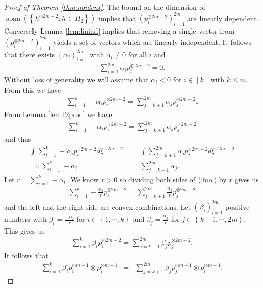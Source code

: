 \documentclass{article} %
\def\span{\operatorname{span}}
\theoremstyle{definition}
\begin{document}
\begin{proof}[Proof of Theorem \ref{thm:noident}]
The bound on the dimension of $\span\left( \left\{ h^{\otimes 2m-2}: h \in H_2 \right\} \right)$ implies that $\left( p_i^{\otimes 2m-2} \right)_{i=1}^{2m}$ are linearly dependent. Conversely Lemma \ref{lem:linind} implies that removing a single vector from $\left( p_i^{\otimes 2m-2} \right)_{i=1}^{2m}$ yields a set of vectors which are linearly independent. It follows that there exists $\left( \alpha_i \right)_{i=1}^{2m}$ with $\alpha_i \neq 0$ for all $i$ and
\begin{eqnarray*}
	\sum_{i=1}^{2m}\alpha_i p_i^{\otimes 2m-2} = 0.
\end{eqnarray*}
Without loss of generality we will assume that $\alpha_i<0$ for $i\in \left[ k \right]$ with $k\le m$. From this we have 
\begin{eqnarray}\label{foo}
	\sum_{i=1}^{k}-\alpha_i p_i^{\otimes 2m-2}=\sum_{j=k+1}^{2m}\alpha_j p_j^{\otimes 2m-2}.
\end{eqnarray}
From Lemma \ref{lem:l2prod} we have
\begin{eqnarray*}
	\sum_{i=1}^{k}-\alpha_i p_i^{\times 2m-2}=\sum_{j=k+1}^{2m}\alpha_j p_j^{\times 2m-2}
\end{eqnarray*}
and thus
\begin{eqnarray*}
	\int \sum_{i=1}^{k}-\alpha_i p_i^{\times 2m-2} d\xi^{\times 2m-2 }&=&\int \sum_{j=k+1}^{2m}\alpha_j p_j^{\times 2m-2}d\xi^{\times 2m-2 }\\
	 \Rightarrow \sum_{i=1}^{k}-\alpha_i &=&\sum_{j=k+1}^{2m}\alpha_j.
\end{eqnarray*}
Let $r=\sum_{i=1}^{k}-\alpha_i$. We know $r >0$ so dividing both sides of (\ref{foo}) by $r$ gives us
\begin{eqnarray*}
	\sum_{i=1}^{k}-\frac{\alpha_i}{r} p_i^{\otimes 2m-2}=\sum_{j=k+1}^{2m}\frac{\alpha_j}{r} p_j^{\otimes 2m-2}
\end{eqnarray*}
and the left and the right side are convex combinations. Let $\left( \beta_i \right)_{i=1}^{2m}$ positive numbers with $\beta_i = \frac{-\alpha_i}{r}$ for $i \in \left\{ 1,\cdots,k \right\}$ and $\beta_j = \frac{\alpha_j}{r}$ for $j\in \left\{ k+1,\cdots,2m \right\}$. This gives us
\begin{eqnarray*}
	\sum_{i=1}^{k}\beta_i p_i^{\otimes 2m-2}=\sum_{j=k+1}^{2m}\beta_j p_j^{\otimes 2m-2}.
\end{eqnarray*}
 It follows that
\begin{eqnarray*}
	\sum_{i=1}^{k} \beta_i p_i^{\otimes m-1}\otimes p_i^{\otimes m-1}&=&\sum_{j=k+1}^{2m}\beta_j p_j^{\otimes m-1}\otimes p_i^{\otimes m-1}.
\end{eqnarray*}

\end{proof}
\end{document}
